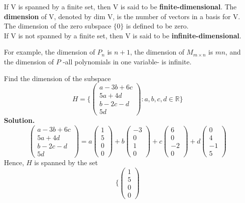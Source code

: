 \documentclass[10pt, a4paper]{article}
\newcommand{\R}{\mathbb{R}}
\begin{document}
\begin{definition}
    If V is spanned by a finite set, then V is said to be \textbf{finite-dimensional}. The \textbf{dimension} of V, denoted by dim V, is the number of vectors in a basis for V.
    The dimension of the zero subspace $\{0\}$ is defined to be zero.\\
    If V is not spanned by a finite set, then V is said to be \textbf{infinite-dimensional}.
\end{definition}
\indent For example, the dimension of $P_n$ is $n+1$, the dimension of $M_{m\times n}$ is $mn$, and the dimension of $P$ -all polynomials in one variable- is infinite.
\begin{example}
    Find the dimension of the subspace \[
    H=\{\begin{pmatrix}
        a-3b+6c\\5a+4d\\b-2c-d\\5d
    \end{pmatrix}: a,b,c,d\in\R\}
    \]
    \textbf{Solution.} 
    \[
        \begin{pmatrix}
            a-3b+6c\\5a+4d\\b-2c-d\\5d
        \end{pmatrix} = a\begin{pmatrix}
            1\\5\\0\\0
        \end{pmatrix} + b\begin{pmatrix}
            -3\\0\\1\\0
        \end{pmatrix} + c\begin{pmatrix}
            6\\0\\-2\\0
        \end{pmatrix} + d\begin{pmatrix}
            0\\4\\-1\\5
        \end{pmatrix}
    \]
    Hence, $H$ is spanned by the set $$\{\begin{pmatrix}
        1\\5\\0\\0

\end{pmatrix}$$
\end{example}
\end{document}
